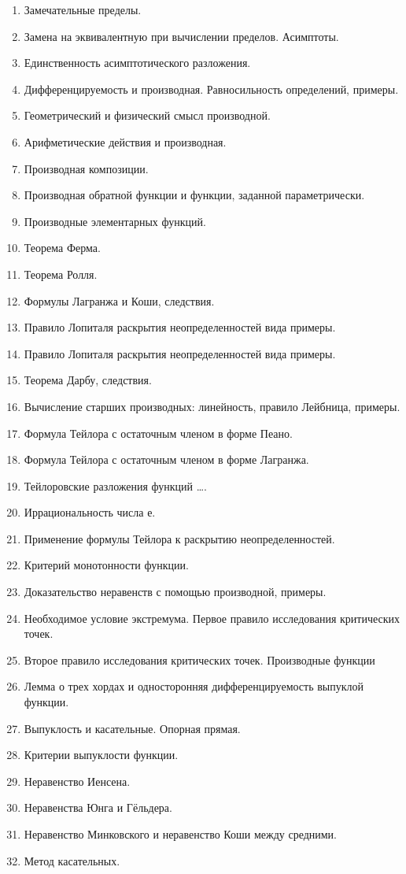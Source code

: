 \documentclass[12pt, a4paper]{article}
\begin{document}
\begin{enumerate}
    \item Замечательные пределы.
    \item Замена на эквивалентную при вычислении пределов. Асимптоты.
    \item Единственность асимптотического разложения.
    \item Дифференцируемость и производная. Равносильность определений, примеры.
    \item Геометрический и физический смысл производной.
    \item Арифметические действия и производная.
    \item Производная композиции.
    \item Производная обратной функции и функции, заданной параметрически.
    \item Производные элементарных функций.
    \item Теорема Ферма.
    \item Теорема Ролля.
    \item Формулы Лагранжа и Коши, следствия.
    \item Правило Лопиталя раскрытия неопределенностей вида примеры.
    \item Правило Лопиталя раскрытия неопределенностей вида примеры.
    \item Теорема Дарбу, следствия.
    \item Вычисление старших производных: линейность, правило Лейбница, примеры.
    \item Формула Тейлора с остаточным членом в форме Пеано.
    \item Формула Тейлора с остаточным членом в форме Лагранжа.
    \item Тейлоровские разложения функций …. %
    \item Иррациональность числа е.
    \item Применение формулы Тейлора к раскрытию неопределенностей.
    \item Критерий монотонности функции.
    \item Доказательство неравенств с помощью производной, примеры.
    \item Необходимое условие экстремума. Первое правило исследования критических точек.
    \item Второе правило исследования критических точек. Производные функции
    \item Лемма о трех хордах и односторонняя дифференцируемость выпуклой функции.
    \item Выпуклость и касательные. Опорная прямая.
    \item Критерии выпуклости функции.
    \item Неравенство Иенсена.
    \item Неравенства Юнга и Гёльдера.
    \item Неравенство Минковского и неравенство Коши между средними.
    \item Метод касательных.
\end{enumerate}
\end{document}
